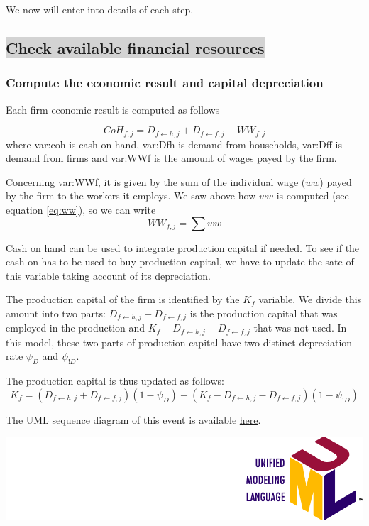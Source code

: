 \documentclass{book}
\newcommand{\umllocation}{file:///Users/giulioni/Dropbox/svn/sfcabm_my/documentation}
\begin{document}
We now will enter into details of each step.
\subsection*{\colorbox{lightgray}{Check available financial resources}}
\subsubsection{Compute the economic result and capital depreciation}
Each firm economic result is computed as follows

\[
	CoH_{f,j}=D_{f\leftarrow h,j}+D_{f\leftarrow f,j}-WW_{f,j}
\]
where \gls{var:coh} is cash on hand, \gls{var:Dfh} is demand from households, \gls{var:Dff} is demand from firms and \gls{var:WWf} is the amount of wages payed by the firm.

Concerning \gls{var:WWf}, it is given by the sum of the individual wage ($ww$) payed by the firm to the workers it employs. We saw above how $ww$ is computed (see equation \ref{eq:ww}), so we can write
\[
	WW_{f,j}=\sum ww
\]


Cash on hand can be used to integrate production capital if needed. To see if the cash on has to be used to buy production capital, we have to update the sate of this variable taking account of its depreciation.

The production capital of the firm is identified by the $K_f$ variable. We divide this amount into two parts: $D_{f\leftarrow h,j}+D_{f\leftarrow f,j}$ is the production capital that was employed in the production and $K_f-D_{f\leftarrow h,j}-D_{f\leftarrow f,j}$ that was not used. In this model, these two parts of production capital have two distinct depreciation rate $\psi_D$ and $\psi_{!D}$.

The production capital is thus updated as follows:
\[
	K_f=(D_{f\leftarrow h,j}+D_{f\leftarrow f,j})(1-\psi_D)+(K_f-D_{f\leftarrow h,j}-D_{f\leftarrow f,j})(1-\psi_{!D})
\]



The UML sequence diagram of this event is available \href{\umllocation/computeEconomicResultAndCapitalDepreciation.html}{here}.
\begin{marginfigure}
	\includegraphics[scale=0.1]{uml.png}
\end{marginfigure}
\end{document}

